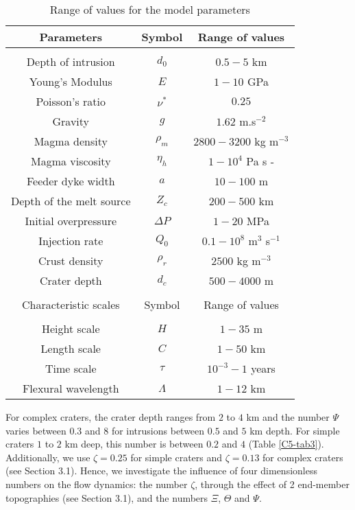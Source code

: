 \begin{table}[h!]
  \caption{Range of values for the model parameters}
  \centering
  \begin{tabular}{c|c|c}
    \hline
    Parameters& Symbol & Range of values \\
    \hline
              &&\\
    Depth of intrusion & $d_0$ & $0.5-5$ km \\
    Young's Modulus & $E$ & $1-10$ GPa \\
    Poisson's ratio & $\nu^*$ & $0.25$ \\
    Gravity & $g$ & $1.62$ m.s$^{-2}$ \\
    Magma density & $\rho_{m}$ & $2800-3200$ kg m$^{-3}$ \\
    Magma viscosity & $\eta_h $ & $1-10^{4}$ Pa s -\\
    Feeder dyke width & $ a$ & $10-100$ m \\
    Depth of the melt source & $Z_{c}$ & $ 200-500$ km \\ 
    Initial overpressure & $\Delta P$ & $1-20$ MPa \\
    Injection rate & $Q_{0}$ &$0.1-10^8$ m$^{3}$ s$^{-1}$ \\
    Crust density & $\rho_r$ & $2500$ kg m$^{-3}$ \\
    Crater depth & $d_{c}$ & $500-4000$ m \\
              &&\\
    \hline
    Characteristic scales & Symbol & Range of values \\
    \hline
              &&\\
    Height scale & $H$& $1-35$ m \\
    Length scale & $C$    & $1-50$ km \\
    Time scale & $\tau$ & $10^{-3}-1$ years \\
    Flexural wavelength & $\Lambda$ & $1-12$ km 
                                      \label{C5-tab2}
  \end{tabular} 
\end{table}
	 
For complex  craters, the crater depth  ranges from $2$ to  $4$ km and
the number $\Psi$ varies between  $0.3$ and $8$ for intrusions between
$0.5$ and $5$  km depth. For simple  craters $1$ to $2$  km deep, this
number is between $0.2$  and $4$ (Table \ref{C5-tab3}).  Additionally,
we use  $\zeta=0.25$ for simple  craters and $\zeta=0.13$  for complex
craters (see Section 3.1). Hence, we investigate the influence of four
dimensionless  numbers  on  the  flow dynamics:  the  number  $\zeta$,
through the effect of 2 end-member topographies (see Section 3.1), and
the numbers $\Xi$, $\Theta$ and $\Psi$.
	
